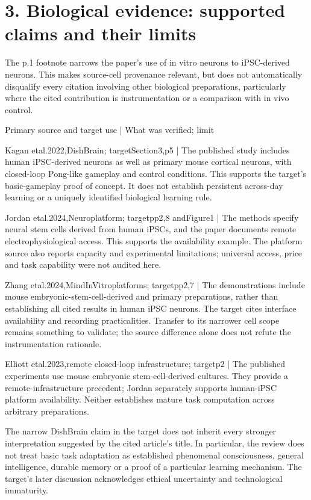 \documentclass[10pt]{article}
\begin{document}
\section*{3. Biological evidence: supported claims and their limits}
The p.1 footnote narrows the paper’s use of in vitro neurons to iPSC-derived neurons. This makes source-cell provenance relevant, but does not automatically disqualify every citation involving other biological preparations, particularly where the cited contribution is instrumentation or a comparison with in vivo control.\par
Primary source and target use | What was verified; limit\par
Kagan etal.2022,DishBrain; targetSection3,p5 | The published study includes human iPSC-derived neurons as well as primary mouse cortical neurons, with closed-loop Pong-like gameplay and control conditions. This supports the target’s basic-gameplay proof of concept. It does not establish persistent across-day learning or a uniquely identified biological learning rule.\par
Jordan etal.2024,Neuroplatform; targetpp2,8 andFigure1 | The methods specify neural stem cells derived from human iPSCs, and the paper documents remote electrophysiological access. This supports the availability example. The platform source also reports capacity and experimental limitations; universal access, price and task capability were not audited here.\par
Zhang etal.2024,MindInVitroplatforms; targetpp2,7 | The demonstrations include mouse embryonic-stem-cell-derived and primary preparations, rather than establishing all cited results in human iPSC neurons. The target cites interface availability and recording practicalities. Transfer to its narrower cell scope remains something to validate; the source difference alone does not refute the instrumentation rationale.\par
Elliott etal.2023,remote closed-loop infrastructure; targetp2 | The published experiments use mouse embryonic stem-cell-derived cultures. They provide a remote-infrastructure precedent; Jordan separately supports human-iPSC platform availability. Neither establishes mature task computation across arbitrary preparations.\par
The narrow DishBrain claim in the target does not inherit every stronger interpretation suggested by the cited article’s title. In particular, the review does not treat basic task adaptation as established phenomenal consciousness, general intelligence, durable memory or a proof of a particular learning mechanism. The target’s later discussion acknowledges ethical uncertainty and technological immaturity.\par
\end{document}
